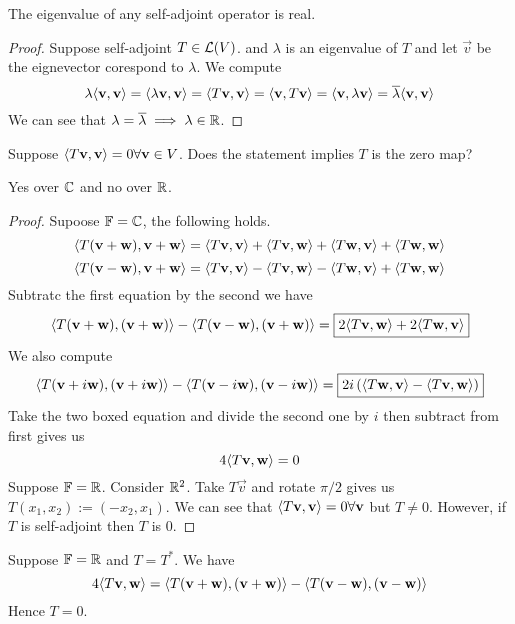 \begin{proposition}
	The eigenvalue of any self-adjoint operator is real.
\end{proposition}
\begin{proof}
Suppose self-adjoint $T \in \mathcal L(V)$. and $\lambda$ is an eigenvalue of $T$ and let $\vec v$ be the eignevector corespond to $\lambda$. We compute 
\[
	\lambda \langle \mathbf v, \mathbf v \rangle = \langle \lambda \mathbf v, \mathbf v \rangle 
	= \langle T\mathbf v, \mathbf v \rangle 
	= \langle \mathbf v, T\mathbf v \rangle 
	= \langle \mathbf v, \lambda \mathbf v \rangle 
	= \overline \lambda \langle \mathbf v, \mathbf v \rangle
\] We can see that $\lambda = \overline \lambda \implies \lambda \in \mathbb R$.
\end{proof}
\begin{question}
	Suppose $\langle T\mathbf v,\mathbf v \rangle = 0 \forall \mathbf v \in V$. Does the statement implies $T$ is the zero map?
\end{question}
\begin{answer}[Surprisingly]
	Yes over $\mathbb C$ and no over $\mathbb R$.
\end{answer}
\begin{proof}
	Supoose $\mathbb F = \mathbb C$, the following holds.
	\[ \langle T(\mathbf v + \mathbf w), \mathbf v + \mathbf w \rangle = \langle T\mathbf v, \mathbf v \rangle + \langle T\mathbf v, \mathbf w \rangle + \langle T\mathbf w,\mathbf v \rangle + \langle T\mathbf w, \mathbf w \rangle \]
	\[ \langle T(\mathbf v - \mathbf w), \mathbf v + \mathbf w \rangle = \langle T\mathbf v, \mathbf v \rangle - \langle T\mathbf v, \mathbf w \rangle - \langle T\mathbf w,\mathbf v \rangle + \langle T\mathbf w, \mathbf w \rangle \]
	Subtratc the first equation by the second we have 
	\[ \langle T(\mathbf v + \mathbf w), (\mathbf v + \mathbf w) \rangle - \langle T(\mathbf v - \mathbf w), (\mathbf v + \mathbf w) \rangle =\boxed{ 2\langle T\mathbf v, \mathbf w\rangle + 2\langle T\mathbf w, \mathbf v \rangle} \]
	We also compute 
	\[ \langle T(\mathbf v + i\mathbf w) , (\mathbf v + i\mathbf w)\rangle - \langle T(\mathbf v - i\mathbf w) , (\mathbf v - i\mathbf w)\rangle = \boxed{2i\left(\langle T\mathbf w, \mathbf v\rangle - \langle T\mathbf v, \mathbf w \rangle\right)}\]
	Take the two boxed equation and divide the second one by $i$ then subtract from first gives us 
	\[ 4\langle T \mathbf v, \mathbf w \rangle = 0\]
	Suppose $\mathbb F = \mathbb R$. Consider $\mathbb R^2$. Take $T\vec v$ and rotate $\pi / 2$ gives us $T(x_1, x_2) := (-x_2 , x_1)$. We can see that $\langle T\mathbf v, \mathbf v \rangle = 0 \forall \mathbf v$ but $T \neq 0$. However, if $T$ is self-adjoint then $T$ is $0$.
\end{proof}
\begin{remark}
	Suppose $\mathbb F = \mathbb R$ and $T = T^*$. We have 
	\[ 4\langle T\mathbf v, \mathbf w \rangle = \langle T(\mathbf v + \mathbf w), (\mathbf v + \mathbf w) \rangle - \langle T(\mathbf v - \mathbf w), (\mathbf v - \mathbf w )\rangle\]
	Hence $T = 0$. 
\end{remark}


